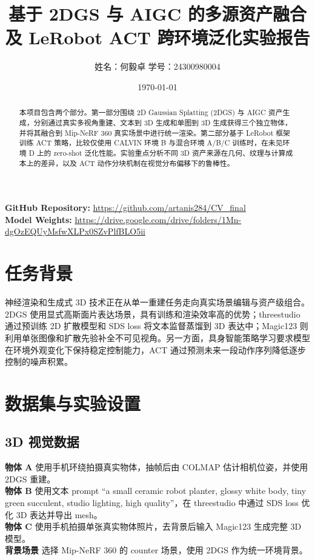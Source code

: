 \documentclass[10pt]{ctexart}
\title{基于 2DGS 与 AIGC 的多源资产融合及 LeRobot ACT 跨环境泛化实验报告}
\author{姓名：何毅卓{\hspace{3cm}} \quad 学号：24300980004{\hspace{3cm}}}
\date{\today}
\begin{document}
\maketitle

\noindent\textbf{GitHub Repository:} \url{https://github.com/artanis284/CV_final}\\
\textbf{Model Weights:} \url{https://drive.google.com/drive/folders/1Mn-dgOzEQUyMsfwXLPx0SZvPlfBLO5ii}\\

\begin{abstract}
本项目包含两个部分。第一部分围绕 2D Gaussian Splatting (2DGS) 与 AIGC 资产生成，分别通过真实多视角重建、文本到 3D 生成和单图到 3D 生成获得三个独立物体，并将其融合到 Mip-NeRF 360 真实场景中进行统一渲染。第二部分基于 LeRobot 框架训练 ACT 策略，比较仅使用 CALVIN 环境 B 与混合环境 A/B/C 训练时，在未见环境 D 上的 zero-shot 泛化性能。实验重点分析不同 3D 资产来源在几何、纹理与计算成本上的差异，以及 ACT 动作分块机制在视觉分布偏移下的鲁棒性。
\end{abstract}

\section{任务背景}
神经渲染和生成式 3D 技术正在从单一重建任务走向真实场景编辑与资产级组合。2DGS 使用显式高斯面片表达场景，具有训练和渲染效率高的优势；threestudio 通过预训练 2D 扩散模型和 SDS loss 将文本监督蒸馏到 3D 表达中；Magic123 则利用单张图像和扩散先验补全不可见视角。另一方面，具身智能策略学习要求模型在环境外观变化下保持稳定控制能力，ACT 通过预测未来一段动作序列降低逐步控制的噪声积累。

\section{数据集与实验设置}
\subsection{3D 视觉数据}
\textbf{物体 A} 使用手机环绕拍摄真实物体，抽帧后由 COLMAP 估计相机位姿，并使用 2DGS 重建。\\
\textbf{物体 B} 使用文本 prompt ``a small ceramic robot planter, glossy white body, tiny green succulent, studio lighting, high quality''，在 threestudio 中通过 SDS loss 优化 3D 表达并导出 mesh。\\
\textbf{物体 C} 使用手机拍摄单张真实物体照片，去背景后输入 Magic123 生成完整 3D 模型。\\
\textbf{背景场景} 选择 Mip-NeRF 360 的 counter 场景，使用 2DGS 作为统一环境背景。
\end{document}

